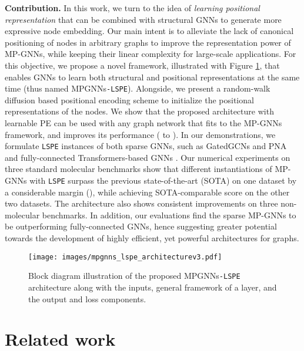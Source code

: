 \documentclass{article} \usepackage{iclr2021_conference,times}
\begin{document}
{\bf Contribution.} In this work, we turn to the idea of {\it learning positional representation} that can be combined with structural GNNs to generate more expressive node embedding. Our main intent is to alleviate the lack of canonical positioning of nodes in arbitrary graphs to improve the representation power of MP-GNNs, while keeping their linear complexity for large-scale applications.
For this objective, we propose a novel framework, illustrated with Figure \ref{fig:mpgnns_lspe_architecture}, that enables GNNs to learn both structural and positional representations at the same time (thus named MPGNNs\texttt{-LSPE}).
Alongside, we present a random-walk diffusion based positional encoding scheme to initialize the positional representations of the nodes.
We show that the proposed architecture with learnable PE can be used with any graph network that fits to the MP-GNNs framework, 
and improves its performance 
(
to ).
In our demonstrations, we formulate \texttt{LSPE} instances of both sparse GNNs, such as GatedGCNs \citep{bresson2017residual} and PNA \citep{corso2020principal} and fully-connected Transformers-based GNNs \citep{kreuzer2021rethinking, mialon2021graphit}.
Our numerical experiments on three standard molecular benchmarks show that different instantiations of MP-GNNs with \texttt{LSPE} surpass the previous state-of-the-art (SOTA) on one dataset by a considerable margin 
(), while achieving SOTA-comparable score on 
the other two datasets.
The architecture also shows consistent improvements on three non-molecular benchmarks. In addition, our evaluations find the sparse MP-GNNs to be outperforming fully-connected GNNs, hence suggesting greater potential towards the development of highly efficient, yet powerful architectures for graphs.

\begin{figure}[!t]
    \centering
    \texttt{[image: images/mpgnns\_lspe\_architecturev3.pdf]}
    \vspace{-3pt}
    \caption{Block diagram illustration of the proposed MPGNNs\texttt{-LSPE} architecture along with the inputs, general framework of a layer, and the output and loss components.}
    \label{fig:mpgnns_lspe_architecture}
    \vspace{-9pt}
\end{figure}


\section{Related work}
\label{sec:related_work}
\end{document}
